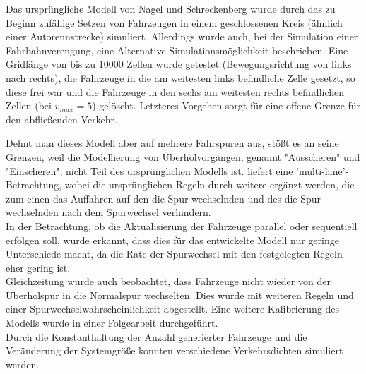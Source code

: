 Das ursprüngliche Modell von Nagel und Schreckenberg wurde durch das zu Beginn zufällige Setzen von Fahrzeugen in einem geschlossenen Kreis (ähnlich einer Autorennstrecke) simuliert. Allerdings wurde auch, bei der Simulation einer Fahrbahnverengung, eine Alternative Simulationsmöglichkeit beschrieben. Eine Gridlänge von bis zu 10000 Zellen wurde getestet (Bewegungsrichtung von links nach rechts), die Fahrzeuge in die am weitesten links befindliche Zelle gesetzt, so diese frei war und die Fahrzeuge in den sechs am weitesten rechts befindlichen Zellen (bei $v_{max}=5$) gelöscht. Letzteres Vorgehen sorgt für eine offene Grenze für den abfließenden Verkehr.

Dehnt man dieses Modell aber auf mehrere Fahrspuren aus, stößt es an seine Grenzen, weil die Modellierung von Überholvorgängen, genannt "Ausscheren" und "Einscheren", nicht Teil des ursprünglichen Modells ist. \cite{multi-lane} liefert eine 'multi-lane'-Betrachtung, wobei die ursprünglichen Regeln durch weitere ergänzt werden, die zum einen das Auffahren auf den die Spur wechselnden und des die Spur wechselnden nach dem Spurwechsel verhindern. \\
In der Betrachtung, ob die Aktualisierung der Fahrzeuge parallel oder sequentiell erfolgen soll, wurde erkannt, dass dies für das entwickelte Modell nur geringe Unterschiede macht, da die Rate der Spurwechsel mit den festgelegten Regeln eher gering ist. \\
Gleichzeitung wurde auch beobachtet, dass Fahrzeuge nicht wieder von der Überholspur in die Normalspur wechselten. Dies wurde mit weiteren Regeln und einer Spurwechselwahrscheinlichkeit abgestellt. Eine weitere Kalibrierung des Modells wurde in einer Folgearbeit durchgeführt. \\
Durch die Konstanthaltung der Anzahl generierter Fahrzeuge und die Veränderung der Systemgröße konnten verschiedene Verkehrsdichten simuliert werden. 

